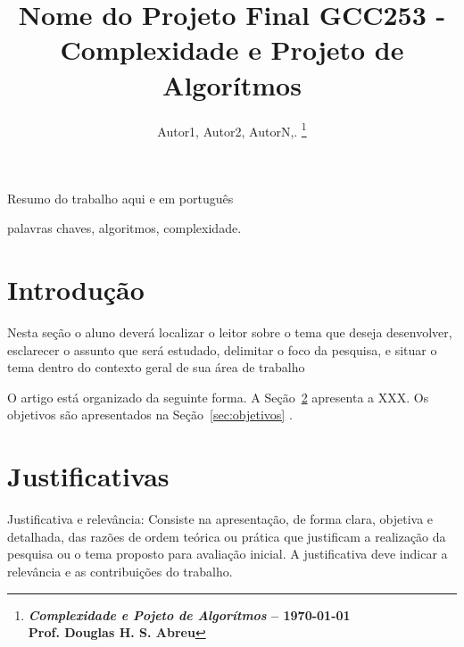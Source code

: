 \documentclass[portuguese]{sbrt}
\begin{document}
 
  
\title{Nome do Projeto Final GCC253 - Complexidade e Projeto de Algorítmos} 
  
\author{Autor1, Autor2, AutorN,. 
\thanks{\centering \textbf{\textit{Complexidade e Pojeto de Algorítmos} -- \today \\ Prof. Douglas H. S. Abreu}}%
} 
  
\maketitle 

  
  
  
  
\begin{resumo} 
Resumo do trabalho aqui e em português 
\end{resumo} 
\begin{chave} 
palavras chaves, algoritmos, complexidade. 
\end{chave} 
  

  
  

\section{Introdução} 
\label{sec:introducao} 
  
Nesta seção o aluno deverá localizar o leitor sobre o tema que deseja desenvolver, esclarecer o assunto que será estudado, delimitar o foco da pesquisa, e situar o tema dentro do contexto geral de sua área de trabalho~\cite{cormen:2009}

O artigo está organizado da seguinte forma.
A Seção~\ref{sec:justificativa} apresenta a XXX. 
Os objetivos são apresentados na Seção~\ref{sec:objetivos}
. 
\section{Justificativas}
\label{sec:justificativa}
  
Justificativa e relevância: Consiste na apresentação, de forma clara, objetiva e detalhada, das razões de ordem teórica ou prática que justificam a realização da pesquisa ou o tema proposto para avaliação inicial. A justificativa deve indicar a relevância e as contribuições do trabalho.
  
\end{document}
